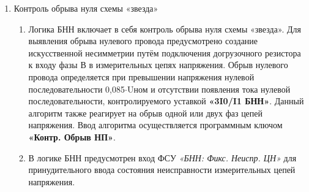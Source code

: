 \begin{enumerate}
\begin{enumerate}
\item
При этом переход несимметричного повреждения в симметричное не приводит к возврату БНН, а также обеспечивается отсутствие ложного срабатывания при КЗ в силовой цепи.

\item
Сигнал обрыва трех фаз подхватывается энергонезависимым триггером при снижении напряжения прямой последовательности ниже уставки \textbf{«U1 мин комб. БНН»}. Возврат цепи происходит после повторного повышения напряжения прямой последовательности более уставки \textbf{«U1 мин БНН»} (рекомендуемое значение уставки 0,1$\cdot$Uном). Если измерительные ТН установлены на линии, то дополнительно контролируется включенное положение выключателя.

\item
Для контроля одновременного исчезновения трех фазных напряжений используются три реле минимального напряжения в фазах А, В, С. Отсутствие напряжения определяется при снижении всех фазных напряжений меньше уставки \textbf{«Uф минк комб. БНН»} в течение 5 секунд и наличии тока в защищаемой линии, определяемого по сработанному состоянию ИО УРОВ. Отсутствие напряжение действует на формирование сигнала обрыва трех фаз.

\end{enumerate}

\item Контроль обрыва нуля схемы «звезда»
\begin{enumerate}

\item
Логика БНН включает в себя контроль обрыва нуля схемы «звезда». Для выявления обрыва нулевого провода предусмотрено создание искусственной несимметрии путём подключения догрузочного резистора к входу фазы В в измерительных цепях напряжения. Обрыв нулевого провода определяется при превышении напряжения нулевой последовательности 0,085$\cdot$Uном и отсутствии появления тока нулевой последовательности, контролируемого уставкой \textbf{«3I0/I1 БНН»}. Данный алгоритм также реагирует на обрыв одной или двух фаз цепей напряжения. Ввод алгоритма осуществляется программным ключом \textbf{«Контр. Обрыв НП»}.

\item 
В логике БНН предусмотрен вход ФСУ \textit{«БНН: Фикс. Неиспр. ЦН»} для принудительного ввода состояния неисправности измерительных цепей напряжения.


\end{enumerate}
\end{enumerate}
